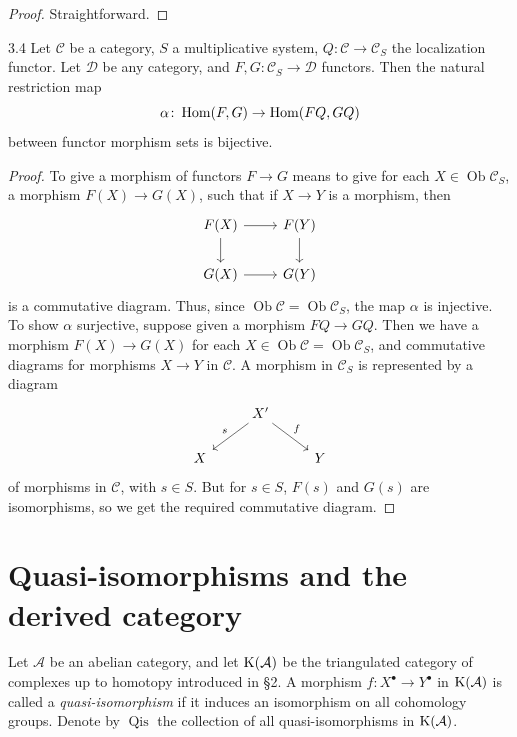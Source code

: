 \begin{proof}
Straightforward.
\end{proof}

\begin{bookproposition}{3.4}\label{prop:1.3.4}
Let $\mathcal{C}$ be a category, $S$ a multiplicative system, $Q\colon\mathcal{C}\to\mathcal{C}_S$ the localization functor. Let $\mathcal{D}$ be any category, and $F,G\colon\mathcal{C}_S\to\mathcal{D}$ functors. Then the natural restriction map
\[
\alpha\colon \operatorname{Hom}(F,G) \to \operatorname{Hom}(FQ,GQ)
\]
between functor morphism sets is bijective.
\end{bookproposition}

\begin{proof}
To give a morphism of functors \(F \longrightarrow G\) means to give for each \(X \in \operatorname{Ob} \mathcal{C}_S\), a morphism \(F(X) \longrightarrow G(X)\), such that if \(X \longrightarrow Y\) is a morphism, then
\[
\begin{tikzcd}
	F(X) \arrow[r] \arrow[d] & F(Y) \arrow[d] \\
	G(X) \arrow[r] & G(Y)
\end{tikzcd}
\]
is a commutative diagram. Thus, since \(\operatorname{Ob} \mathcal{C} = \operatorname{Ob} \mathcal{C}_S\), the map \(\alpha\) is injective. To show \(\alpha\) surjective, suppose given a morphism \(FQ \longrightarrow GQ\). Then we have a morphism \(F(X) \longrightarrow G(X)\) for each \(X \in \operatorname{Ob} \mathcal{C} = \operatorname{Ob} \mathcal{C}_S\), and commutative diagrams for morphisms \(X \longrightarrow Y\) in \(\mathcal{C}\). A morphism in \(\mathcal{C}_S\) is represented by a diagram
\[
\begin{tikzcd}
	& X' \arrow[ld, "s"'] \arrow[rd, "f"] & \\
	X & & Y
\end{tikzcd}
\]
of morphisms in \(\mathcal{C}\), with \(s \in S\). But for \(s \in S\), \(F(s)\) and \(G(s)\) are isomorphisms, so we get the required commutative diagram.

\end{proof}

\section{Quasi-isomorphisms and the derived category}\label{sec:1.4}

Let $\mathcal{A}$ be an abelian category, and let $\operatorname{K}(\mathcal{A})$ be the triangulated category of complexes up to homotopy introduced in \S2. A morphism $f\colon X^\bullet\to Y^\bullet$ in $\operatorname{K}(\mathcal{A})$ is called a \emph{quasi-isomorphism} if it induces an isomorphism on all cohomology groups. Denote by $\operatorname{Qis}$ the collection of all quasi-isomorphisms in $\operatorname{K}(\mathcal{A})$.

